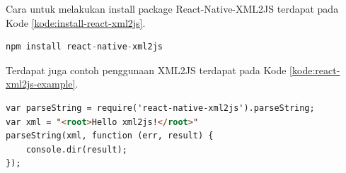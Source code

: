 Cara untuk melakukan install package React-Native-XML2JS terdapat pada Kode \ref{kode:install-react-xml2js}.
\begin{lstlisting}[language=Awk, caption=Kode untuk Menginstal Komponen React-Axios, label=kode:install-react-xml2js]
npm install react-native-xml2js
\end{lstlisting}

Terdapat juga contoh penggunaan XML2JS terdapat pada Kode \ref{kode:react-xml2js-example}.
\begin{lstlisting}[language=HTML, caption=Kode Contoh Penggunaan XML2JS, label=kode:react-xml2js-example]
var parseString = require('react-native-xml2js').parseString;
var xml = "<root>Hello xml2js!</root>"
parseString(xml, function (err, result) {
    console.dir(result);
});
\end{lstlisting}

  

